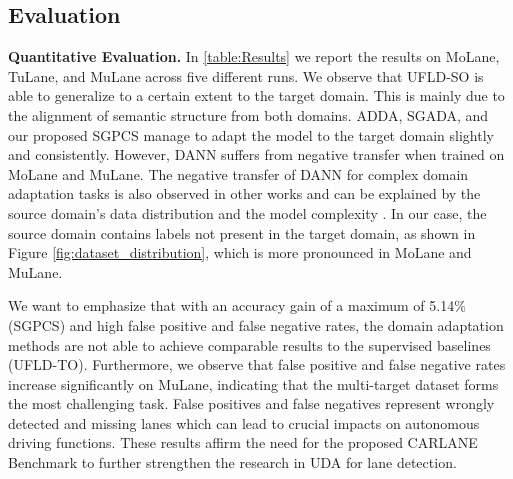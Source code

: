 \documentclass{article}
\begin{document}
	\subsection{Evaluation}
	\textbf{Quantitative Evaluation.}
	In \autoref{table:Results} we report the results on MoLane, TuLane, and MuLane across five different runs. We observe that UFLD-SO is able to generalize to a certain extent to the target domain. This is mainly due to the alignment of semantic structure from both domains. ADDA, SGADA, and our proposed SGPCS manage to adapt the model to the target domain slightly and consistently. However, DANN suffers from negative transfer \cite{wang2019characterizing} when trained on MoLane and MuLane. The negative transfer of DANN for complex domain adaptation tasks is also observed in other works \cite{ tanwisuth2021prototype,fan2022self, wang2019characterizing, kim2020cross} and can be explained by the source domain's data distribution and the model complexity \cite{wang2019characterizing}. In our case, the source domain contains labels not present in the target domain, as shown in Figure \ref{fig:dataset_distribution}, which is more pronounced in MoLane and MuLane.
	
	We want to emphasize that with an accuracy gain of a maximum of 5.14\% (SGPCS) and high false positive and false negative rates, the domain adaptation methods are not able to achieve comparable results to the supervised baselines (UFLD-TO). Furthermore, we observe that false positive and false negative rates increase significantly on MuLane, indicating that the multi-target dataset forms the most challenging task. False positives and false negatives represent wrongly detected and missing lanes which can lead to crucial impacts on autonomous driving functions. These results affirm the need for the proposed CARLANE Benchmark to further strengthen the research in UDA for lane detection.
	
\end{document}
